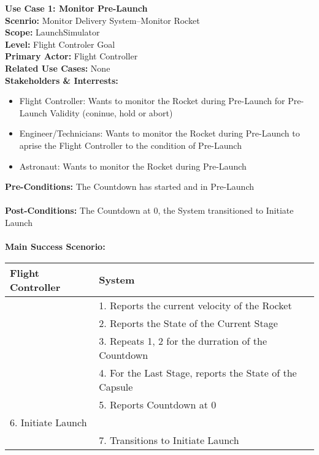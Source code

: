 \documentclass[letterpaper]{article}
\begin{document}
\noindent
\textbf{Use Case 1: Monitor Pre-Launch}\\
\textbf{Scenrio:  }Monitor Delivery System--Monitor Rocket\\
\textbf{Scope:  }LaunchSimulator\\
\textbf{Level:  }Flight Controler Goal\\
\textbf{Primary Actor:  }Flight Controller\\
\textbf{Related Use Cases:  }None\\
\textbf{Stakeholders \& Interrests:  }
\begin{itemize}
\item Flight Controller:  Wants to monitor the Rocket during
Pre-Launch for Pre-Launch Validity (coninue, hold or abort)
\item Engineer/Technicians:  Wants to monitor the Rocket during
Pre-Launch to aprise the Flight Controller to the condition of
Pre-Launch
\item Astronaut:  Wants to monitor the Rocket during Pre-Launch 
\end{itemize}
\textbf{Pre-Conditions:  }The Countdown has started and in
Pre-Launch\\\\
\textbf{Post-Conditions:  }The Countdown at 0, the System transitioned
to Initiate Launch\\\\
\textbf{Main Success Scenorio: }\\
\begin{tabular}{|p{5.75cm}|p{5.75cm}|}\hline
\textbf{Flight Controller} & \textbf{System}\\\hline
& 1.  Reports the current velocity of the Rocket\\\hline
& 2.  Reports the State of the Current Stage\\\hline
& 3.  Repeats 1, 2 for the durration of the Countdown\\\hline
& 4.  For the Last Stage, reports the State of the Capsule\\\hline
& 5.  Reports Countdown at 0\\\hline
6.  Initiate Launch &\\\hline
& 7.  Transitions to Initiate Launch\\\hline
\end{tabular}
\end{document}
